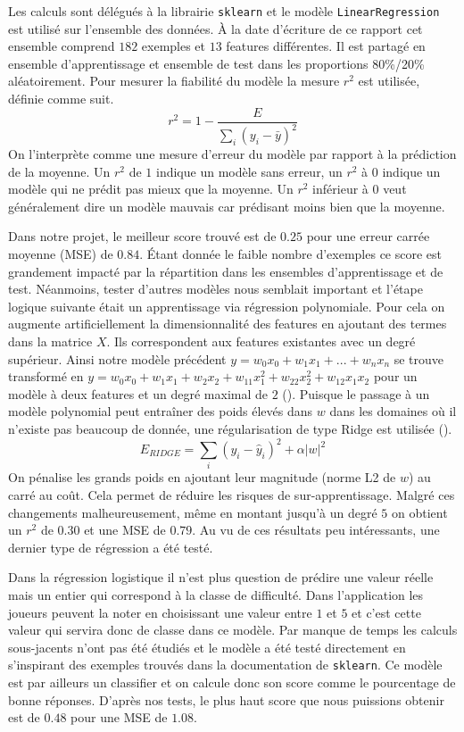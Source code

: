 \documentclass[../main.tex]{subfiles}
\begin{document}
Les calculs sont délégués à la librairie \texttt{sklearn} et le modèle \texttt{LinearRegression} est utilisé sur l'ensemble des données. À la date d'écriture de ce rapport cet ensemble comprend $182$ exemples et $13$ features différentes. Il est partagé en ensemble d'apprentissage et ensemble de test dans les proportions 80\%/20\% aléatoirement. Pour mesurer la fiabilité du modèle la mesure $r^2$ est utilisée, définie comme suit.
\begin{equation*}
    r^2 = 1 - \frac{E}{\sum_i (y_i - \bar{y})^2}
\end{equation*}
On l'interprète comme une mesure d'erreur du modèle par rapport à la prédiction de la moyenne. Un $r^2$ de $1$ indique un modèle sans erreur, un $r^2$ à $0$ indique un modèle qui ne prédit pas mieux que la moyenne. Un $r^2$ inférieur à $0$ veut généralement dire un modèle mauvais car prédisant moins bien que la moyenne. 

Dans notre projet, le meilleur score trouvé est de $0.25$ pour une erreur carrée moyenne (MSE) de $0.84$. Étant donnée le faible nombre d'exemples ce score est grandement impacté par la répartition dans les ensembles d'apprentissage et de test. Néanmoins, tester d'autres modèles nous semblait important et l'étape logique suivante était un apprentissage via régression polynomiale. Pour cela on augmente artificiellement la dimensionnalité des features en ajoutant des termes dans la matrice $X$. Ils correspondent aux features existantes avec un degré supérieur. Ainsi notre modèle précédent $y = w_0x_0 + w_1x_1 + ... + w_nx_n$ se trouve transformé en $y = w_0x_0 + w_1x_1 + w_2x_2 + w_{11}x_1^2 + w_{22}x_2^2 + w_{12}x_1x_2$ pour un modèle à deux features et un degré maximal de $2$ (\cite{sinha}). Puisque le passage à un modèle polynomial peut entraîner des poids élevés dans $w$ dans les domaines où il n'existe pas beaucoup de donnée, une régularisation de type Ridge est utilisée ().
\begin{equation}
\label{eq-ridge}
E_{RIDGE} = \sum_i (y_i - \hat{y}_i)^2 + \alpha|w|^2
\end{equation}
On pénalise les grands poids en ajoutant leur magnitude (norme L2 de $w$) au carré au coût. Cela permet de réduire les risques de sur-apprentissage. Malgré ces changements malheureusement, même en montant jusqu'à un degré $5$ on obtient un $r^2$ de $0.30$ et une MSE de $0.79$. Au vu de ces résultats peu intéressants, une dernier type de régression a été testé.

Dans la régression logistique il n'est plus question de prédire une valeur réelle mais un entier qui correspond à la classe de difficulté. Dans l'application les joueurs peuvent la noter en choisissant une valeur entre $1$ et $5$ et c'est cette valeur qui servira donc de classe dans ce modèle. Par manque de temps les calculs sous-jacents n'ont pas été étudiés et le modèle a été testé directement en s'inspirant des exemples trouvés dans la documentation de \texttt{sklearn}. Ce modèle est par ailleurs un classifier et on calcule donc son score comme le pourcentage de bonne réponses. D'après nos tests, le plus haut score que nous puissions obtenir est de $0.48$ pour une MSE de $1.08$.
\end{document}
